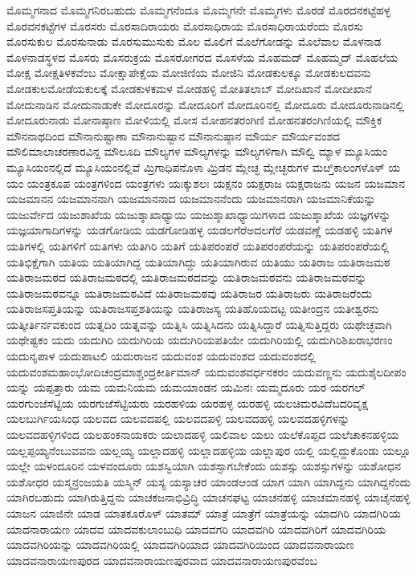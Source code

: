{ಮೊಮ್ಮಗನಾದ
ಮೊಮ್ಮಗನಿರಬಹುದು
ಮೊಮ್ಮಗನೆಂದೂ
ಮೊಮ್ಮಗನೇ
ಮೊಮ್ಮಗಳು
ಮೊರಡೆ
ಮೊರದನಕಟ್ಟೆಹಳ್ಳ
ಮೊರವನಕಟ್ಟೆಗಳ
ಮೊರಸರು
ಮೊರಸಾದಿರಾಯರು
ಮೊರಸಾಧಿರಾಯ
ಮೊರಸಾಧಿರಾಯರೆಂದು
ಮೊರಸು
ಮೊರಸುಕುಲ
ಮೊರಸುನಾಡು
ಮೊರಸುಮುಸುಕು
ಮೊಲ
ಮೊಲಿಗೆ
ಮೊಲೆಗೋಡನ್ನು
ಮೊಲೆವಾಲ
ಮೊಳನಾಡ
ಮೊಳನಾಡಸ್ಥಳದ
ಮೊಸರು
ಮೊಸರುಕ್ರಯ
ಮೊಸರೋಗರದ
ಮೊಸಳೆಯ
ಮೊಹಮದ್
ಮೊಹಮ್ಮದ್
ಮೊಹಲೆಯ
ಮೋಕ್ಷ
ಮೋಕ್ಷತಿಳಕವೆಂಬ
ಮೋಕ್ಷಾಪೇಕ್ಷೆಯ
ಮೋಜಿಣಿಯ
ಮೋಜಿನಿ
ಮೋಡಕುಲಕ್ಕೂ
ಮೋಡಕುಲದವನು
ಮೋಡಕುಲಮೋಡೆಯಕುಲಕ್ಕೆ
ಮೋಡಕುಳಕಮಳ
ಮೋಡಹಳ್ಳಿ
ಮೋತಿತಲಾಬ್
ಮೋದಿಖಾನೆ
ಮೋದೀಖಾನೆ
ಮೋದುನಾಡಿನ
ಮೋದುನಾಡುಕೇ
ಮೋದೂರನ್ನು
ಮೋದೂರಿಗೆ
ಮೋದೂರಿನಲ್ಲಿ
ಮೋದೂರು
ಮೋದೂರುನಾಡಿನಲ್ಲಿ
ಮೋದೂರುನಾಡು
ಮೋನಾಷ್ಠಾಣ
ಮೋಳಿಯಲ್ಲಿ
ಮೋಸ
ಮೋಹನತರಂಗಿಣಿ
ಮೋಹನತರಂಗಿಣಿಯಲ್ಲಿ
ಮೌಕ್ತಿಕ
ಮೌನನಾಥದಿಂದ
ಮೌನಾನುಷ್ಟಾಣಾ
ಮೌನಾನುಷ್ಟಾನ
ಮೌನಾನುಷ್ಠಾನ
ಮೌರ್ಯ
ಮೌರ್ಯವಂಶದ
ಮೌಲಿಮಾಲಾಚರಣಾರವಿನ್ದ
ಮೌಲೂದಿ
ಮೌಲ್ಯಗಳ
ಮೌಲ್ಯಗಳನ್ನು
ಮೌಲ್ಯಗಳಿಗಾಗಿ
ಮೌಲ್ವಿ
ಮ್ಯಾಳ
ಮ್ಯೂಸಿಯಂ
ಮ್ಯೂಸಿಯಂನಲ್ಲಿದೆ
ಮ್ಯೂಸಿಯಂನಲ್ಲಿವೆ
ಮ್ರಿಗಾಧಿಪನೊಳಾ
ಮ್ರಿಡನ
ಮ್ಲೇಚ್ಛ
ಮ್ಲೇಚ್ಛರುಗಳ
ಮೞ್ತಿಕಾಲಂಗಳೊಳ್
ಯ
ಯಂ
ಯಂತ್ರಕೂಪ
ಯಂತ್ರಗಳಿಂದ
ಯಂತ್ರಗಳು
ಯಃಕ್ಕುಶಲಃ
ಯಕ್ಷನಂ
ಯಕ್ಷರಾಜ
ಯಕ್ಷರಾಜನು
ಯಜನ
ಯಜಮಾನ
ಯಜಮಾನನ
ಯಜಮಾನನಾಗಿ
ಯಜಮಾನನಾದ
ಯಜಮಾನನೆಂದು
ಯಜಮಾನರಾಗಿ
ಯಜಮಾನಿಕೆಯನ್ನು
ಯಜುರ್ವೇದ
ಯಜುಶಾಖೆಯ
ಯಜುಶ್ಶಾಖಾಧ್ಯಾಯಿ
ಯಜುಶ್ಶಾಖಾಧ್ಯಾಯಿಗಳಾದ
ಯಜುಶ್ಶಾಖೆಯ
ಯಜ್ಞಗಳನ್ನು
ಯಜ್ಞಯಾಗಾದಿಗಳನ್ನು
ಯಡಗೋಡಿಯ
ಯಡಗೋಡಿಹಳ್ಳ
ಯಡಲಗೆರೆಅದಲಗೆರೆ
ಯಡವಣ್ಣೆ
ಯಡಹಳ್ಳಿ
ಯತಿಗಳ
ಯತಿಗಳಲ್ಲಿ
ಯತಿಗಳಿಗೆ
ಯತಿಗಳು
ಯತಿಗಿರಿ
ಯತಿಗೆ
ಯತಿಪರಂಪರೆ
ಯತಿಪರಂಪರೆಯನ್ನು
ಯತಿಪರಂಪರೆಯಲ್ಲಿ
ಯತಿಭಿಕ್ಷೆಗಾಗಿ
ಯತಿಯ
ಯತಿಯಾಗಿದ್ದ
ಯತಿಯಾಗಿದ್ದು
ಯತಿಯಾಗಿರುವ
ಯತಿಯು
ಯತಿರಾಜ
ಯತಿರಾಜಮಠ
ಯತಿರಾಜಮಠದ
ಯತಿರಾಜಮಠದಲ್ಲಿ
ಯತಿರಾಜಮಠದವನ್ನು
ಯತಿರಾಜಮಠವನು
ಯತಿರಾಜಮಠವನ್ನು
ಯತಿರಾಜಮಠವನ್ನೂ
ಯತಿರಾಜಮಠವಿದೆ
ಯತಿರಾಜಮಠವು
ಯತಿರಾಜರ
ಯತಿರಾಜರು
ಯತಿರಾಜರೆಂದು
ಯತಿರಾಜಸಪ್ತತಿಯನ್ನು
ಯತಿರಾಜಸಪ್ತಶತಿಯನ್ನು
ಯತಿರಾಜಸ್ಯ
ಯತಿಹೊಯದಟ್ಟ
ಯತೀಂದ್ರನ
ಯತೀಶ್ವರನು
ಯತ್ಕೀರ್ತಿರ್ನವಕುಂದ
ಯತ್ನದಿಂ
ಯತ್ನವನ್ನು
ಯತ್ನಿಸಿ
ಯತ್ನಿಸಿದನು
ಯತ್ನಿಸಿದ್ದಾರೆ
ಯತ್ನಿಸುತ್ತಿದ್ದರು
ಯಥೇಚ್ಛವಾಗಿ
ಯಥೇಷ್ಟಕಂ
ಯದು
ಯದುಗಿರಿ
ಯದುಗಿರಿಯ
ಯದುಗಿರಿಯಪತಿಯೇ
ಯದುಗಿರಿಯಲ್ಲಿ
ಯದುಗಿರಿಶಿಖರಾಭರಣಂ
ಯದುನೃಪಾಳ
ಯದುಪಾಟಲಿ
ಯದುರಾಜನ
ಯದುವಂಶ
ಯದುವಂಶದ
ಯದುವಂಶದಲ್ಲಿ
ಯದುವಂಶಮಹಾಂಭೋದಿಚಂದ್ರಮಾಶ್ಚಂದ್ರಕೀರ್ತಿಮಾನ್
ಯದುವಂಶವರ್ಧನಕರಂ
ಯದುವಣ್ಣನು
ಯದುಶೈಲದೀಪಂ
ಯನ್ನು
ಯಪ್ಪತ್ತಾರು
ಯಮ
ಯಮನಿಯಮ
ಯಮಯಾಂಡನ
ಯಮಿನಃ
ಯಮ್ಮದೂರು
ಯರ
ಯರಗಲ್
ಯರಗುಂಜೆಸೆಟ್ಟಿಯ
ಯರಗುಜೆಸೆಟ್ಟಿಯರು
ಯರಹಳಿಯ
ಯರಹಳ್ಳ
ಯರಹಳ್ಳಿ
ಯಲಚಿಮರವಿದೆಬದರಿವೃಕ್ಷ
ಯಲಬುರ್ಗಿಯಸಿಂಧ
ಯಲವದ
ಯಲವದಪಲ್ಲಿ
ಯಲವದಪಳ್ಳಿ
ಯಲವದಹಳ್ಳಿ
ಯಲವದಹಳ್ಳಿಗಳನ್ನು
ಯಲವದಹಳ್ಳಿಗಳಿಂದ
ಯಲಹಂಕನಾಯಕರು
ಯಲಾದಹಳ್ಳಿ
ಯಲಿವಾಲ
ಯಲು
ಯಲೆಕೊಪ್ಪದ
ಯಲೆಚಾಕನಹಳ್ಳಿಯ
ಯಲ್ಲಪ್ಪಯ್ಯನೆಂಬುವವನು
ಯಲ್ಲಯ್ಯ
ಯಲ್ಲಾದಹಳ್ಳಿ
ಯಲ್ಲಾದಹಳ್ಳಿಯ
ಯಲ್ಲಾಪುರ
ಯಲ್ಲಿ
ಯಲ್ಲಿದ್ದುಕೊಂಡು
ಯಲ್ಲೂ
ಯಲ್ಲೇ
ಯಳಂದೂರಿನ
ಯಳವಂದೂರು
ಯಶಸ್ವಿಯಾಗಿ
ಯಶಸ್ಸಾಗಬೇಕೆಂದು
ಯಶಸ್ಸು
ಯಶಸ್ಸುಗಳನ್ನು
ಯಶೋಧನ
ಯಶೋಧರ
ಯಸ್ಮನ್ರಂಜಯತಿ
ಯಸ್ಮಿನ್
ಯಸ್ಯ
ಯಸ್ಯಾಚರ
ಯಾಂಡಆಂಡ
ಯಾಗ
ಯಾಗಿ
ಯಾಗಿದ್ದನು
ಯಾಗಿದ್ದನೆಂದು
ಯಾಗಿರಬಹುದು
ಯಾಗಿರುತ್ತಿದ್ದನು
ಯಾಚಕಜನಾಭಿವ್ರಿದ್ಧಿ
ಯಾಚನಘಟ್ಟ
ಯಾಚನಹಳ್ಳಿ
ಯಾಚಮಾನಹಳ್ಳಿ
ಯಾಚೈನಹಳ್ಳಿ
ಯಾಜನ
ಯಾಜಿನೇ
ಯಾಡ
ಯಾತಕೂರೊಳ್
ಯಾತಮ್
ಯಾತ್ರೆ
ಯಾತ್ರೆಗೆ
ಯಾತ್ರೆಯನ್ನು
ಯಾದಗಿರಿ
ಯಾದಗಿರಿಯ
ಯಾದನಾರಾಯಣ
ಯಾದವ
ಯಾದವಕುಲಾಂಬುಧಿ
ಯಾದವಗರಿ
ಯಾದವಗಿರಿ
ಯಾದವಗಿರಿಗೆ
ಯಾದವಗಿರಿಯ
ಯಾದವಗಿರಿಯನ್ನು
ಯಾದವಗಿರಿಯಲ್ಲಿ
ಯಾದವಗಿರಿಯಾದ
ಯಾದವಗಿರಿಯಿಂದ
ಯಾದವನಾರಾಯಣ
ಯಾದವನಾರಾಯಣಪುರದ
ಯಾದವನಾರಾಯಣಪುರವಾದ
ಯಾದವನಾರಾಯಣಪುರವೆಂಬ
}
